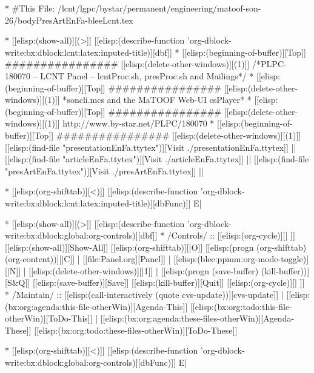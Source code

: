 
\begin{whenOrg}
*  #This File: /lcnt/lgpc/bystar/permanent/engineering/matoof-son-26/bodyPresArtEnFa-bleeLcnt.tex
\end{whenOrg}

\begin{whenOrg}
* [[elisp:(show-all)][(>]] [[elisp:(describe-function 'org-dblock-write:bx:dblock:lcnt:latex:inputed-title)][dbf]]
*  [[elisp:(beginning-of-buffer)][Top]] ################  [[elisp:(delete-other-windows)][(1)]]   /*PLPC-180070 -- LCNT Panel -- lcntProc.sh, presProc.sh and Mailings*/
*  [[elisp:(beginning-of-buffer)][Top]] ################  [[elisp:(delete-other-windows)][(1)]]   *soncli.mcs and the MaTOOF Web-UI csPlayer*
*  [[elisp:(beginning-of-buffer)][Top]] ################  [[elisp:(delete-other-windows)][(1)]]   http://www.by-star.net/PLPC/180070
*  [[elisp:(beginning-of-buffer)][Top]] ################  [[elisp:(delete-other-windows)][(1)]]   [[elisp:(find-file "presentationEnFa.ttytex")][Visit ./presentationEnFa.ttytex]] || [[elisp:(find-file "articleEnFa.ttytex")][Visit ./articleEnFa.ttytex]] || [[elisp:(find-file "presArtEnFa.ttytex")][Visit ./presArtEnFa.ttytex]] ||

* [[elisp:(org-shifttab)][<)]] [[elisp:(describe-function 'org-dblock-write:bx:dblock:lcnt:latex:inputed-title)][dbFunc)]]  E|
\end{whenOrg}

\begin{whenOrg}
* [[elisp:(show-all)][(>]] [[elisp:(describe-function 'org-dblock-write:bx:dblock:global:org-controls)][dbf]]
*  /Controls/ ::  [[elisp:(org-cycle)][| ]]  [[elisp:(show-all)][Show-All]]  [[elisp:(org-shifttab)][|O]]  [[elisp:(progn (org-shifttab) (org-content))][|C]] | [[file:Panel.org][Panel]] | [[elisp:(blee:ppmm:org-mode-toggle)][|N]] | [[elisp:(delete-other-windows)][|1]] | [[elisp:(progn (save-buffer) (kill-buffer))][S&Q]]  [[elisp:(save-buffer)][Save]]  [[elisp:(kill-buffer)][Quit]] [[elisp:(org-cycle)][| ]]
*  /Maintain/ ::  [[elisp:(call-interactively (quote cvs-update))][cvs-update]] | [[elisp:(bx:org:agenda:this-file-otherWin)][Agenda-This]] [[elisp:(bx:org:todo:this-file-otherWin)][ToDo-This]] | [[elisp:(bx:org:agenda:these-files-otherWin)][Agenda-These]] [[elisp:(bx:org:todo:these-files-otherWin)][ToDo-These]]

* [[elisp:(org-shifttab)][<)]] [[elisp:(describe-function 'org-dblock-write:bx:dblock:global:org-controls)][dbFunc)]]  E|
\end{whenOrg}

